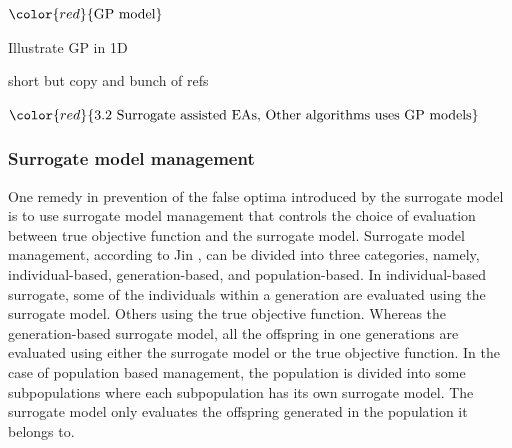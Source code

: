 $\color{red}{\text{GP model}}$

Illustrate GP in 1D 

short but copy and bunch of refs

$\color{red}{\text{3.2 Surrogate assisted EAs, Other algorithms uses GP models}}$


\subsubsection{Surrogate model management}\label{sssec:surrogate_model_management}\hfill


One remedy in prevention of the false optima introduced by the surrogate model is to use surrogate model management that controls the choice of evaluation between true objective function and the surrogate model. Surrogate model management, according to Jin \cite{Jin:2005:CSF:1039803.1039805},  can be divided into three categories, namely, individual-based, generation-based, and population-based. In individual-based surrogate, some of the individuals within a generation are evaluated using the surrogate model. Others using the true objective function. Whereas the generation-based surrogate model, all the offspring in one generations are evaluated using either the surrogate model or the true objective function. In the case of population based management, the population is divided into some subpopulations where each subpopulation has its own surrogate model. The surrogate model only evaluates the offspring generated in the population it belongs to. 







